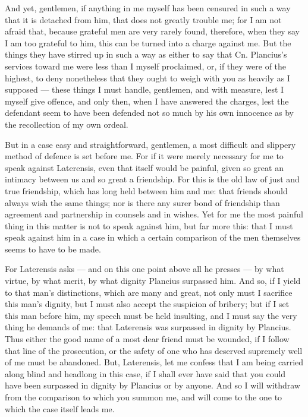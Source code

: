  And yet, gentlemen, if anything in me myself has been censured in such a way that it is detached from him, that does not greatly trouble me; for I am not afraid that, because grateful men are very rarely found, therefore, when they say I am too grateful to him, this can be turned into a charge against me. But the things they have stirred up in such a way as either to say that Cn. Plancius's services toward me were less than I myself proclaimed, or, if they were of the highest, to deny nonetheless that they ought to weigh with you as heavily as I supposed --- these things I must handle, gentlemen, and with measure, lest I myself give offence, and only then, when I have answered the charges, lest the defendant seem to have been defended not so much by his own innocence as by the recollection of my own ordeal.

 But in a case easy and straightforward, gentlemen, a most difficult and slippery method of defence is set before me. For if it were merely necessary for me to speak against Laterensis, even that itself would be painful, given so great an intimacy between us and so great a friendship. For this is the old law of just and true friendship, which has long held between him and me: that friends should always wish the same things; nor is there any surer bond of friendship than agreement and partnership in counsels and in wishes. Yet for me the most painful thing in this matter is not to speak against him, but far more this: that I must speak against him in a case in which a certain comparison of the men themselves seems to have to be made.

 For Laterensis asks --- and on this one point above all he presses --- by what virtue, by what merit, by what dignity Plancius surpassed him. And so, if I yield to that man's distinctions, which are many and great, not only must I sacrifice this man's dignity, but I must also accept the suspicion of bribery; but if I set this man before him, my speech must be held insulting, and I must say the very thing he demands of me: that Laterensis was surpassed in dignity by Plancius. Thus either the good name of a most dear friend must be wounded, if I follow that line of the prosecution, or the safety of one who has deserved supremely well of me must be abandoned. But, Laterensis, let me confess that I am being carried along blind and headlong in this case, if I shall ever have said that you could have been surpassed in dignity by Plancius or by anyone. And so I will withdraw from the comparison to which you summon me, and will come to the one to which the case itself leads me.

